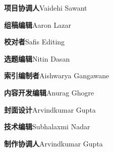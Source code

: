 
\textbf{项目协调人}Vaidehi Sawant



\textbf{组稿编辑}Aaron Lazar



\textbf{校对者}Safis Editing



\textbf{选题编辑}Nitin Dasan



\textbf{索引编制者}Aishwarya Gangawane



\textbf{内容开发编辑}Anurag Ghogre



\textbf{封面设计}Arvindkumar Gupta



\textbf{技术编辑}Subhalaxmi Nadar



\textbf{制作协调人}Arvindkumar Gupta

\par\endgroup
